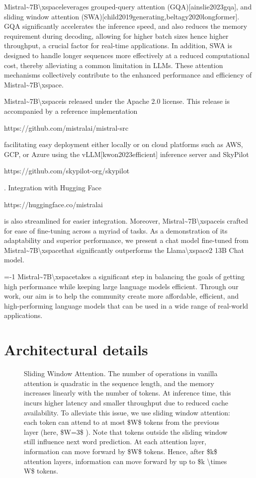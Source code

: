 \documentclass[11pt,a4paper]{article}
\begin{document}
Mistral\textasciitilde{}7B\textbackslash{}xspaceleverages grouped-query attention (GQA)[ainslie2023gqa], and sliding window attention (SWA)[child2019generating,beltagy2020longformer]. GQA significantly accelerates the inference speed, and also reduces the memory requirement during decoding, allowing for higher batch sizes hence higher throughput, a crucial factor for real-time applications. In addition, SWA is designed to handle longer sequences more effectively at a reduced computational cost, thereby alleviating a common limitation in LLMs. These attention mechanisms collectively contribute to the enhanced performance and efficiency of Mistral\textasciitilde{}7B\textbackslash{}xspace.

Mistral\textasciitilde{}7B\textbackslash{}xspaceis released under the Apache 2.0 license. This release is accompanied by a reference implementation

https://github.com/mistralai/mistral-src

facilitating easy deployment either locally or on cloud platforms such as AWS, GCP, or Azure using the vLLM[kwon2023efficient] inference server and SkyPilot

https://github.com/skypilot-org/skypilot

. Integration with Hugging Face

https://huggingface.co/mistralai

is also streamlined for easier integration. Moreover, Mistral\textasciitilde{}7B\textbackslash{}xspaceis crafted for ease of fine-tuning across a myriad of tasks. As a demonstration of its adaptability and superior performance, we present a chat model fine-tuned from Mistral\textasciitilde{}7B\textbackslash{}xspacethat significantly outperforms the Llama\textbackslash{}xspace2 13B  Chat model.

=-1 Mistral\textasciitilde{}7B\textbackslash{}xspacetakes a significant step in balancing the goals of getting high performance while keeping large language models efficient. Through our work, our aim is to help the community create more affordable, efficient, and high-performing language models that can be used in a wide range of real-world applications.

\section{Architectural details}

\begin{figure}[h]
\caption{Sliding Window Attention. The number of operations in vanilla attention is quadratic in the sequence length, and the memory increases linearly with the number of tokens. At inference time, this incurs higher latency and smaller throughput due to reduced cache availability. To alleviate this issue, we use sliding window attention: each token can attend to at most  \$W\$  tokens from the previous layer (here,  \$W=3\$ ). Note that tokens outside the sliding window still influence next word prediction. At each attention layer, information can move forward by  \$W\$  tokens. Hence, after  \$k\$  attention layers, information can move forward by up to  \$k \textbackslash{}times W\$  tokens.}
\end{figure}
\end{document}
